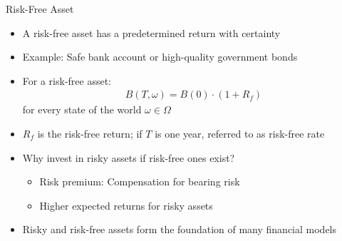 \documentclass[10pt]{beamer}
\begin{document}

\begin{frame}{Risk-Free Asset}
  \begin{itemize}[<+->]
    \item A risk-free asset has a predetermined return with certainty
    \item Example: Safe bank account or high-quality government bonds
    \item For a risk-free asset:
    \begin{align*}
      B(T, \omega) = B(0) \cdot (1 + R_f)
    \end{align*}
    for every state of the world $\omega \in \Omega$
    \item $R_f$ is the risk-free return; if $T$ is one year, referred to as risk-free rate
    \item Why invest in risky assets if risk-free ones exist?
      \begin{itemize}
        \item Risk premium: Compensation for bearing risk
        \item Higher expected returns for risky assets
      \end{itemize}
    \item Risky and risk-free assets form the foundation of many financial models
  \end{itemize}
\end{frame}
\end{document}
